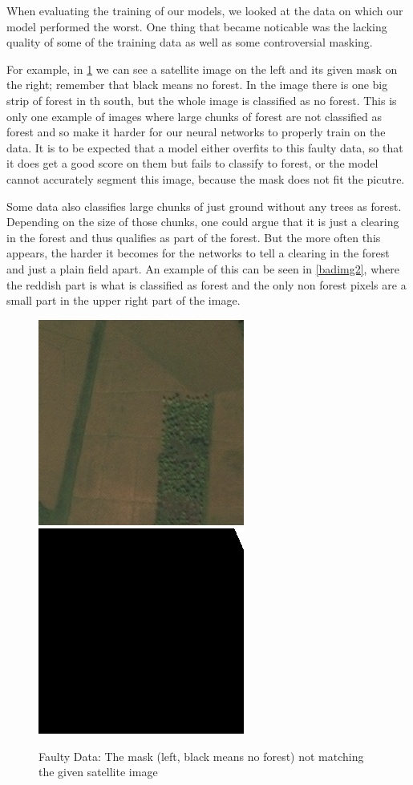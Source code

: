 When evaluating the training of our models, we looked at the data on which our model performed the worst. One thing that became noticable was the lacking quality of some of the training data as well as some controversial masking.

For example, in \ref{badimg} we can see a satellite image on the left and its given mask on the right; remember that black means no forest. In the image there is one big strip of forest in th south, but the whole image is classified as no forest. This is only one example of images where large chunks of forest are not classified as forest and so make it harder for our neural networks to properly train on the data. It is to be expected that a model either overfits to this faulty data, so that it does get a good score on them but fails to classify to forest, or the model cannot accurately segment this image, because the mask does not fit the picutre.

Some data also classifies large chunks of just ground without any trees as forest. Depending on the size of those chunks, one could argue that it is just a clearing in the forest and thus qualifies as part of the forest. But the more often this appears, the harder it becomes for the networks to tell a clearing in the forest and just a plain field apart. An example of this can be seen in \ref{badimg2}, where the reddish part is what is classified as forest and the only non forest pixels are a small part in the upper right part of the image.

\begin{figure}
  \begin{center}
  \label{badimg}
  \includegraphics[width=.4\linewidth]{images/satellite_images/1_imag}
  \includegraphics[width=.4\linewidth]{images/satellite_images/1_mask}
  \caption{Faulty Data: The mask (left, black means no forest) not matching the given satellite image}
  \end{center}
\end{figure}

